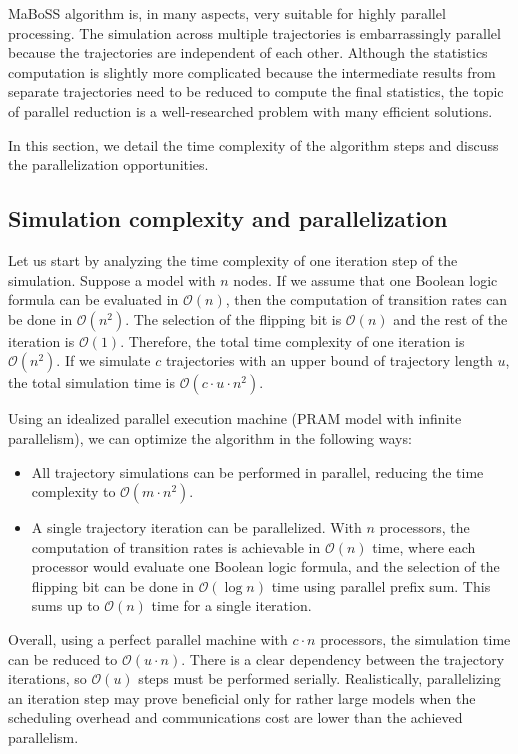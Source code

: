 \documentclass[times, twoside]{zHenriquesLab-StyleBioRxiv}
\begin{document}
MaBoSS algorithm is, in many aspects, very suitable for highly parallel processing. The simulation across multiple trajectories is embarrassingly parallel because the trajectories are independent of each other. Although the statistics computation is slightly more complicated because the intermediate results from separate trajectories need to be reduced to compute the final statistics, the topic of parallel reduction is a well-researched problem with many efficient solutions. 

In this section, we detail the time complexity of the algorithm steps and discuss the parallelization opportunities.

\subsection*{Simulation complexity and parallelization}

Let us start by analyzing the time complexity of one iteration step of the simulation. Suppose a model with $n$ nodes. If we assume that one Boolean logic formula can be evaluated in $\mathcal{O}(n)$, then the computation of transition rates can be done in $\mathcal{O}(n^2)$. The selection of the flipping bit is $\mathcal{O}(n)$ and the rest of the iteration is $\mathcal{O}(1)$. Therefore, the total time complexity of one iteration is $\mathcal{O}(n^2)$. If we simulate $c$ trajectories with an upper bound of trajectory length $u$, the total simulation time is $\mathcal{O}(c \cdot u \cdot n^2)$. 

Using an idealized parallel execution machine (PRAM model with infinite parallelism), we can optimize the algorithm in the following ways: 
\begin{itemize}
    \item All trajectory simulations can be performed in parallel, reducing the time complexity to $\mathcal{O}(m \cdot n^2)$.
    \item A single trajectory iteration can be parallelized. With $n$ processors, the computation of transition rates is achievable in $\mathcal{O}(n)$ time, where each processor would evaluate one Boolean logic formula, and the selection of the flipping bit can be done in $\mathcal{O}(\log{n})$ time using parallel prefix sum. This sums up to $\mathcal{O}(n)$ time for a single iteration. 
\end{itemize}

Overall, using a perfect parallel machine with $c \cdot n$ processors, the simulation time can be reduced to $\mathcal{O}(u \cdot n)$. There is a clear dependency between the trajectory iterations, so $\mathcal{O}(u)$ steps must be performed serially. Realistically, parallelizing an iteration step may prove beneficial only for rather large models when the scheduling overhead and communications cost are lower than the achieved parallelism.
\end{document}
